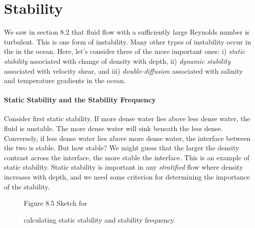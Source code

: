 \section{Stability}
We saw in section 8.2 that fluid flow with a sufficiently large
Reynolds number is turbulent. This is one form of instability. Many
other types of instability occur in the in the ocean. Here, let's
consider three of the more important ones: i) \textit{static
  stability} associated with change of
density with depth, ii) \textit{dynamic
  stability} associated with velocity
shear, and iii) \textit{double-diffusion}
associated with salinity and temperature gradients in the ocean.

\paragraph{Static Stability and the Stability Frequency} Consider first static
stability. If more dense water lies above less dense water, the fluid
is unstable. The more dense water will sink beneath the less
dense. Conversely, if less dense water lies above more dense water,
the interface between the two is stable.  But how stable? We might
guess that the larger the density contrast across the interface, the
more stable the interface. This is an example of static stability.
Static stability is important in any \textit{stratified} flow where
density increases with depth, and we need some criterion for
determining the importance of the stability.

\begin{figure}[b!]
\vspace{1ex}
\centering
\footnotesize
Figure 8.5 Sketch for \rule{0mm}{4ex}calculating static stability and
stability frequency.

\label{fig:stabilitysketch}
\end{figure}

